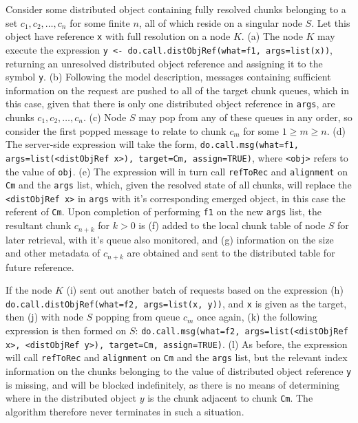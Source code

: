 Consider some distributed object containing fully resolved chunks belonging to
a set \({c_1, c_2, \dots, c_n}\) for some finite \(n\), all of which reside on
a singular node \(S\).
Let this object have reference \texttt{x} with full resolution on a node \(K\).
(\textcolor{dark2-1}{a}) The node \(K\) may execute the expression 
\texttt{y <- do.call.distObjRef(what=f1, args=list(x))}, returning an
unresolved distributed object reference and assigning it to the symbol
\texttt{y}.
(\textcolor{dark2-1}{b}) Following the model description, messages containing sufficient information on
the request are pushed to all of the target chunk queues, which in this case,
given that there is only one distributed object reference in \texttt{args}, are
chunks \(c_1, c_2, \dots, c_n\).
(\textcolor{dark2-1}{c}) Node \(S\) may pop from any of these queues in any order, so consider the first
popped message to relate to chunk \(c_m\) for some \(1 \geq m \geq n\).
(\textcolor{dark2-1}{d}) The server-side expression will take the form, 
\texttt{do.call.msg(what=f1, args=list(<distObjRef x>), target=Cm, assign=TRUE)},
where \texttt{<obj>} refers to the value of \texttt{obj}.
(\textcolor{dark2-1}{e}) The expression will in turn call \texttt{refToRec} and
\texttt{alignment} on \texttt{Cm} and the \texttt{args} list,
which, given the resolved state of all chunks, will replace the
\texttt{<distObjRef x>} in \texttt{args} with it's corresponding emerged
object, in this case the referent of \texttt{Cm}.
Upon completion of performing \texttt{f1} on the new \texttt{args} list, the
resultant chunk \(c_{n+k}\) for \(k > 0 \) is (\textcolor{dark2-1}{f}) added to the local chunk table
of node \(S\) for later retrieval, with it's queue also monitored, and (\textcolor{dark2-1}{g})
information on the size and other metadata of \(c_{n+k}\) are obtained and sent
to the distributed table for future reference.

 If the node \(K\) (\textcolor{dark2-2}{i}) sent out another batch of requests
 based on the expression (\textcolor{dark2-2}{h})
\texttt{do.call.distObjRef(what=f2, args=list(x, y))}, and
\texttt{x} is given as the target, then (\textcolor{dark2-2}{j}) with node \(S\) popping from queue
\(c_m\) once again, (\textcolor{dark2-2}{k}) the following expression is then formed on \(S\):
\texttt{do.call.msg(what=f2, args=list(<distObjRef x>, <distObjRef y>), target=Cm, assign=TRUE)}.
(\textcolor{dark2-2}{l}) As before, the expression will call \texttt{refToRec} and
\texttt{alignment} on \texttt{Cm} and the \texttt{args} list,
but the relevant index information on the chunks belonging to the value of
distributed object reference \texttt{y} is missing, and will be blocked
indefinitely, as there is no means of determining where in the distributed
object \(y\) is the chunk adjacent to chunk \texttt{Cm}.
The algorithm therefore never terminates in such a situation.

